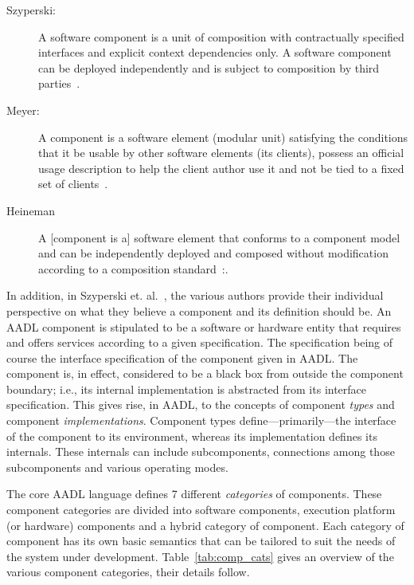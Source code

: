 \begin{description}
\item[Szyperski:]{A software component is a unit of composition with
  contractually specified interfaces and explicit context dependencies
  only. A software component can be deployed independently and is
  subject to composition by third parties~\cite{szyperski-cs}.}

\item[Meyer:]{A component is a software element (modular unit)
  satisfying the conditions that it be usable by other software
  elements (its clients), possess an official usage description to
  help the client author use it and not be tied to a fixed set of
  clients~\cite{meyer@icse03}.}

\item[Heineman]{A [component is a] software element that conforms to a
  component model and can be independently deployed and composed
  without modification according to a composition
  standard~\cite{heineman-components}:.}
\end{description}

In addition, in Szyperski et. al.~\cite{szyperski@sct04}, the various
authors provide their individual perspective on what they believe a
component and its definition should be. An AADL component is
stipulated to be a software or hardware entity that requires and
offers services according to a given specification. The specification
being of course the interface specification of the component given in
AADL. The component is, in effect, considered to be a black box from
outside the component boundary; i.e., its internal implementation is
abstracted from its interface specification. This gives rise, in AADL,
to the concepts of component \emph{types} and component
\emph{implementations}. Component types define---primarily---the
interface of the component to its environment, whereas its
implementation defines its internals. These internals can include
subcomponents, connections among those subcomponents and various
operating modes.

The core AADL language defines 7 different \emph{categories} of
components. These component categories are divided into software
components, execution platform (or hardware) components and a hybrid
category of component. Each category of component has its own basic
semantics that can be tailored to suit the needs of the system under
development. Table~\ref{tab:comp_cats} gives an overview of the
various component categories, their details follow.

